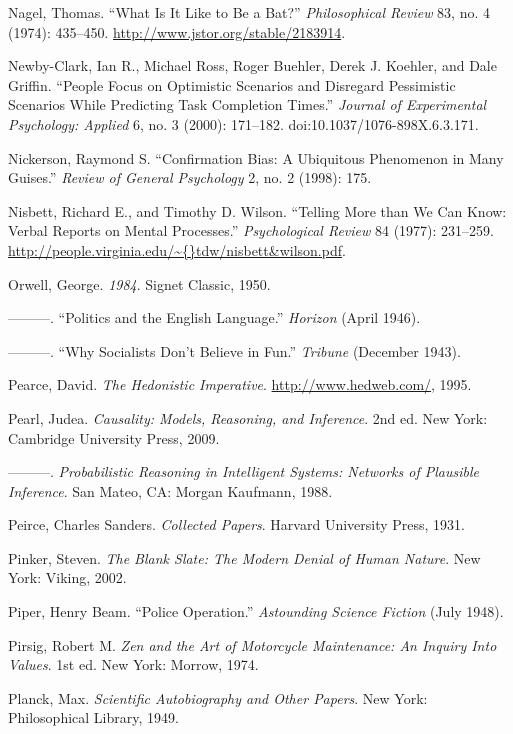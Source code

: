 \documentclass[letterpaper]{book}
\begin{document}
{
 Nagel, Thomas. ``What Is It Like to Be a
Bat?'' \textit{Philosophical Review} 83, no. 4
(1974): 435--450. \url{http://www.jstor.org/stable/2183914}.}

{
 Newby-Clark, Ian R., Michael Ross, Roger Buehler, Derek J.
Koehler, and Dale Griffin. ``People Focus on
Optimistic Scenarios and Disregard Pessimistic Scenarios While
Predicting Task Completion Times.'' \textit{Journal
of Experimental Psychology: Applied} 6, no. 3 (2000): 171--182.
doi:10.1037/1076-898X.6.3.171.}

{
 Nickerson, Raymond S. ``Confirmation Bias: A
Ubiquitous Phenomenon in Many Guises.''
\textit{Review of General Psychology} 2, no. 2 (1998): 175.}

{
 Nisbett, Richard E., and Timothy D. Wilson.
``Telling More than We Can Know: Verbal Reports on
Mental Processes.'' \textit{Psychological Review} 84
(1977): 231--259.
\url{http://people.virginia.edu/\~{}tdw/nisbett\&wilson.pdf}.}

{
 Orwell, George. \textit{1984}. Signet Classic, 1950.}

{
 {}---{}---{}---. ``Politics and the English
Language.'' \textit{Horizon} (April 1946).}

{
 {}---{}---{}---. ``Why Socialists
Don't Believe in Fun.''
\textit{Tribune} (December 1943).}

{
 Pearce, David. \textit{The Hedonistic Imperative}.
\url{http://www.hedweb.com/}, 1995.}

{
 Pearl, Judea. \textit{Causality: Models, Reasoning, and
Inference}. 2nd ed. New York: Cambridge University Press, 2009.}

{
 {}---{}---{}---. \textit{Probabilistic Reasoning in Intelligent
Systems: Networks of Plausible Inference}. San Mateo, CA: Morgan
Kaufmann, 1988.}

{
 Peirce, Charles Sanders. \textit{Collected Papers}. Harvard
University Press, 1931.}

{
 Pinker, Steven. \textit{The Blank Slate: The Modern Denial of
Human Nature}. New York: Viking, 2002.}

{
 Piper, Henry Beam. ``Police
Operation.'' \textit{Astounding Science Fiction}
(July 1948).}

{
 Pirsig, Robert M. \textit{Zen and the Art of Motorcycle
Maintenance: An Inquiry Into Values}. 1st ed. New York: Morrow, 1974.}

{
 Planck, Max. \textit{Scientific Autobiography and Other Papers}.
New York: Philosophical Library, 1949.}
\end{document}
